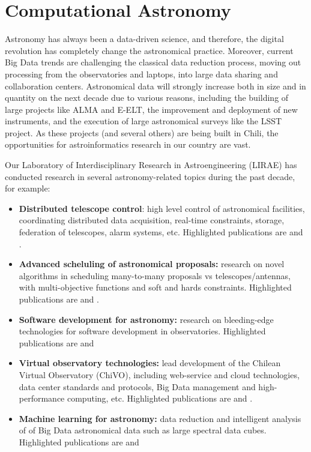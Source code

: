\section{Computational Astronomy}

Astronomy has always been a data-driven science, and therefore,
the digital revolution has completely change the astronomical practice.
Moreover, current Big Data trends are challenging the classical 
data reduction process, moving out processing from the observatories and laptops, 
into large data sharing and collaboration centers. Astronomical data will
strongly increase both in size and in quantity on the next decade due to various
reasons, including the building of large projects like ALMA and E-ELT,
the improvement and deployment of new instruments, and the execution of
large astronomical surveys like the LSST project. 
As these projects (and several others) are being built in Chili, 
the opportunities for astroinformatics research in our country are vast.

Our Laboratory of Interdisciplinary Research in Astroengineering (LIRAE)
has conducted research in several astronomy-related topics during the past 
decade, for example:
\begin{itemize}
\item \textbf{Distributed telescope control}: high level control of astronomical
facilities, coordinating distributed data acquisition, real-time constraints, storage, 
federation of telescopes, alarm systems, etc. Highlighted publications are
\cite{araya08:_acs_rt} and \cite{tobar08:_csat_gtcs}.
\item \textbf{Advanced scheluling of astronomical proposals:} research on novel
algorithms in scheduling many-to-many proposals vs telescopes/antennas, with
multi-objective functions and soft and hards constraints. Highlighted
publications are \cite{mmora10:_survey_aia_dpm} and
\cite{mmora11:_solution_aia_dpm}.
\item \textbf{Software development for astronomy:} research on bleeding-edge
technologies for software development in observatories. Highlighted publications
are \cite{cmaureir10:_hpc_data_trending} and \cite{ntroncoso10:_code_generation}
\item \textbf{Virtual observatory technologies:} lead development of the
Chilean Virtual Observatory (ChiVO), including web-service and cloud technologies, 
data center standards and protocols, Big Data 
management and high-performance computing, etc. Highlighted publications are
\cite{msolar2014:_chivo_manag} and \cite{jantogni2014:_nosql}.
\item \textbf{Machine learning for astronomy:} data reduction 
and intelligent analysis of of Big Data astronomical data such as
large spectral data cubes. Highlighted publications are
\cite{rgregori:_classification_spie} and \cite{maray2014:_asydo}
\end{itemize}



